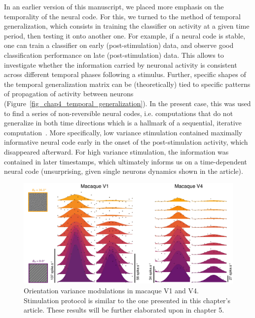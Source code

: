 In an earlier version of this manuscript, we placed more emphasis on the temporality of the neural code. For this, we turned to the method of temporal generalization, which consists in training the classifier on activity at a given time period, then testing it onto another one. For example, if a neural code is stable, one can train a classifier on early (post-stimulation) data, and observe good classification performance on late (post-stimulation) data. This allows to investigate whether the information carried by neuronal activity is consistent across different temporal phases following a stimulus. Further, specific shapes of the temporal generalization matrix can be (theoretically) tied to specific patterns of propagation of activity between neurons (Figure~\ref{fig_chap4_temporal_generalization}). In the present case, this was used to find a series of non-reversible neural codes, i.e. computations that do not generalize in both time directions which is a hallmark of a sequential, iterative computation~\cite{king2014characterizing}. More specifically, low variance stimulation contained maximally informative neural code early in the onset of the post-stimulation activity, which disappeared afterward. For high variance stimulation, the information was contained in later timestamps, which ultimately informs us on a time-dependent neural code (unsurprising, given single neurons dynamics shown in the article).

\begin{figure}[h!tbp]
\vspace{0.1cm}
\centering
\includegraphics[width=1.\textwidth]{fig/chap4_utah_array.pdf}
\caption[Orientation variance modulations in macaques.]{Orientation variance modulations in macaque \gls{V1} and V4. Stimulation protocol is similar to the one presented in this chapter's article. These results will be further elaborated upon in chapter 5.}
\label{fig_chap4_utah_array} 
\end{figure} 

